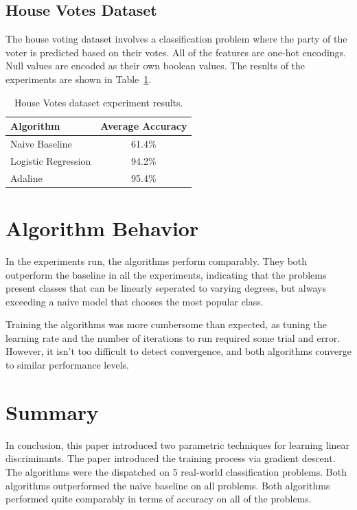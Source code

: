 \documentclass{amsart}
\begin{document}
    \subsection{House Votes Dataset}
    The house voting dataset\cite{housedataset} involves a classification
    problem where the party of the voter is predicted
    based on their votes. All of the features are one-hot encodings.
    Null values are encoded as their own boolean values.
    The results of the experiments are shown in Table~\ref{house_votes_results}.
    \begin{table}[H]
    \begin{tabular}{lc}
    Algorithm & Average Accuracy \\
    \hline
    Naive Baseline & 61.4\% \\
    Logistic Regression & 94.2\% \\
    Adaline & 95.4\%
    \end{tabular}
    \label{house_votes_results}
    \caption{House Votes dataset experiment results.}
    \end{table}

    \section{Algorithm Behavior}
    In the experiments run, the algorithms perform comparably. They both
    outperform the baseline in all the experiments, indicating that the
    problems present classes that can be linearly seperated to varying degrees,
    but always exceeding a naive model that chooses the most popular class.

    Training the algorithms was more cumbersome than expected,
    as tuning the learning rate
    and the number of iterations to run required some trial and error.
    However, it isn't too difficult to detect convergence, and both
    algorithms converge to similar performance levels.

    \section{Summary}
    In conclusion, this paper introduced two parametric techniques for
    learning linear discriminants. The paper introduced the training
    process via gradient descent. The algorithms were the dispatched
    on 5 real-world classification problems. Both algorithms outperformed
    the naive baseline on all problems. Both algorithms performed
    quite comparably in terms of accuracy on all of the problems.



\end{document}
